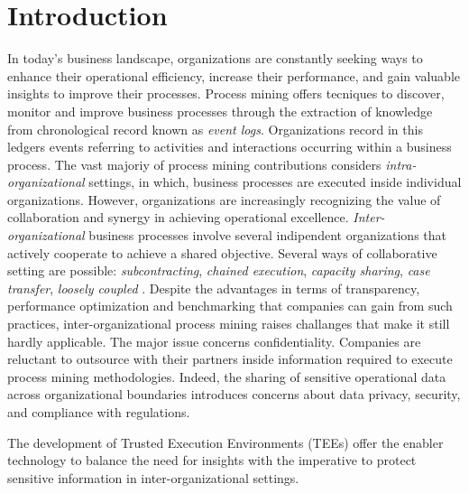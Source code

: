 \section{Introduction}
In today's business landscape, organizations are constantly seeking ways to enhance their operational efficiency, increase their performance, and gain valuable insights to improve their processes. Process mining offers tecniques to discover, monitor and improve business processes through the extraction of knowledge from chronological record known as \textit{event logs}. Organizations record in this ledgers events referring to activities and interactions occurring within a business process. The vast majoriy of process mining contributions considers \textit{intra-organizational} settings, in which, business processes are executed inside individual organizations. However, organizations are increasingly recognizing the value of collaboration and synergy in achieving operational excellence. \textit{Inter-organizational} business processes involve several indipendent organizations that actively cooperate to achieve a shared objective. Several ways of collaborative setting are possible: \textit{subcontracting}, \textit{chained execution}, \textit{capacity sharing}, \textit{case transfer}, \textit{loosely coupled} \cite{van1999process}. Despite the advantages in terms of transparency, performance optimization and benchmarking that companies can gain from such practices, inter-organizational process mining raises challanges that make it still hardly applicable. The major issue concerns confidentiality. Companies are reluctant to outsource with their partners inside information required to execute process mining methodologies. Indeed, the sharing of sensitive operational data across organizational boundaries introduces concerns about data privacy, security, and compliance with regulations. 

The development of Trusted Execution Environments (TEEs) offer the enabler technology to balance the need for insights with the imperative to protect sensitive information in inter-organizational settings.



